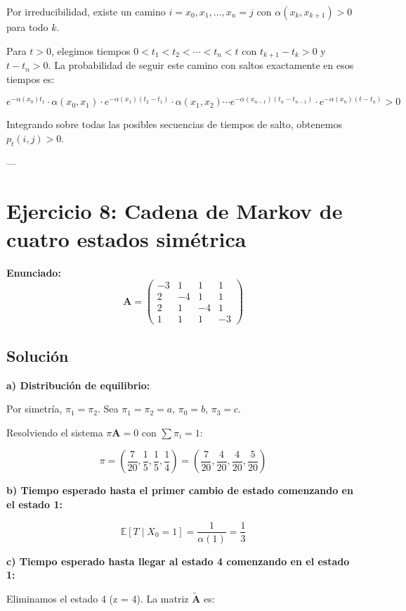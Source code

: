 \documentclass{article}
\theoremstyle{definition}
\newcommand{\E}{\mathbb{E}}
\newcommand{\A}{\mathbf{A}}
\begin{document}
Por irreducibilidad, existe un camino $i = x_0, x_1, \ldots, x_n = j$ con $\alpha(x_k, x_{k+1}) > 0$ para todo $k$.

Para $t > 0$, elegimos tiempos $0 < t_1 < t_2 < \cdots < t_n < t$ con $t_{k+1} - t_k > 0$ y $t - t_n > 0$. La probabilidad de seguir este camino con saltos exactamente en esos tiempos es:

\[
e^{-\alpha(x_0)t_1} \cdot \alpha(x_0,x_1) \cdot e^{-\alpha(x_1)(t_2-t_1)} \cdot \alpha(x_1,x_2) \cdots e^{-\alpha(x_{n-1})(t_n-t_{n-1})} \cdot e^{-\alpha(x_n)(t-t_n)} > 0
\]

Integrando sobre todas las posibles secuencias de tiempos de salto, obtenemos $p_t(i,j) > 0$.

---

\section*{Ejercicio 8: Cadena de Markov de cuatro estados simétrica}

\textbf{Enunciado:} 
\[
\A = \begin{pmatrix}
    -3 & 1 & 1 & 1 \\
    2 & -4 & 1 & 1 \\
    2 & 1 & -4 & 1 \\
    1 & 1 & 1 & -3
\end{pmatrix}
\]

\subsection*{Solución}

\textbf{a) Distribución de equilibrio:}

Por simetría, $\pi_1 = \pi_2$. Sea $\pi_1 = \pi_2 = a$, $\pi_0 = b$, $\pi_3 = c$.

Resolviendo el sistema $\pi\A = 0$ con $\sum \pi_i = 1$:

\[
\pi = \left(\frac{7}{20}, \frac{1}{5}, \frac{1}{5}, \frac{1}{4}\right) = \left(\frac{7}{20}, \frac{4}{20}, \frac{4}{20}, \frac{5}{20}\right)
\]

\textbf{b) Tiempo esperado hasta el primer cambio de estado comenzando en el estado 1:}

\[
\E[T \mid X_0 = 1] = \frac{1}{\alpha(1)} = \frac{1}{3}
\]

\textbf{c) Tiempo esperado hasta llegar al estado 4 comenzando en el estado 1:}

Eliminamos el estado 4 (z = 4). La matriz $\tilde{\A}$ es:
\end{document}
